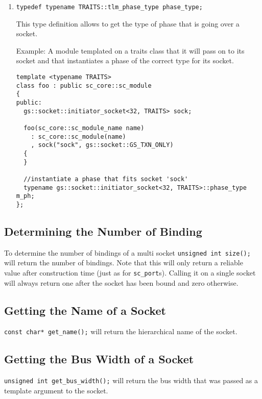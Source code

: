 \documentclass[a4paper,10pt]{article}          %
\begin{document}
\begin{enumerate}
\item
\verb|typedef typename TRAITS::tlm_phase_type phase_type;|

This type definition allows to get the type of phase that is going over a socket.

Example: A module templated on a traits class that it will pass on to its socket and that instantiates a phase of the correct type for its socket.

\begin{small}
\begin{verbatim}
template <typename TRAITS>
class foo : public sc_core::sc_module
{
public:
  gs::socket::initiator_socket<32, TRAITS> sock;

  foo(sc_core::sc_module_name name)
    : sc_core::sc_module(name)
    , sock("sock", gs::socket::GS_TXN_ONLY)
  {
  }
  
  //instantiate a phase that fits socket 'sock'
  typename gs::socket::initiator_socket<32, TRAITS>::phase_type m_ph;
};
\end{verbatim}
\end{small}

\end{enumerate}

\subsection{Determining the Number of Binding}

To determine the number of bindings of a multi socket \verb|unsigned int size();|
will return the number of bindings. Note that this will only return a reliable value after construction time (just as for \verb|sc_port|s). Calling it on a single socket will always return one after the socket has been bound and zero otherwise.

\subsection{Getting the Name of a Socket}

\verb|const char* get_name();| will return the hierarchical name of the socket.

\subsection{Getting the Bus Width of a Socket}

\verb|unsigned int get_bus_width();| will return the bus width that was passed as a template argument to the socket.
\end{document}
